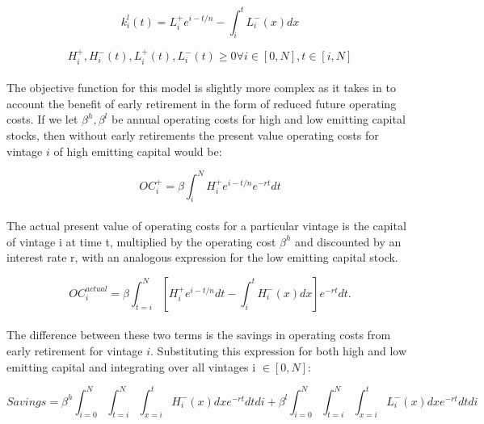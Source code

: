 \documentclass{article}
\begin{document}
\begin{equation}
k_i^l(t) = L_i^+ e^{i-t/n} - \int_i^t L^-_i(x)dx
\end{equation}

\begin{equation}
H^+_i, H^-_i(t), L^+_i(t), L^-_i(t) \geq 0 \forall i \in [0,N], t \in [i,N]
\end{equation}


\paragraph{} The objective function for this model is slightly more complex as it takes in to account the benefit of early retirement in the form of reduced future operating costs. If we let $\beta^h, \beta^l$ be annual operating costs for high and low emitting capital stocks, then without early retirements the present value operating costs for vintage $i$ of high emitting capital would be:

\begin{equation}
OC^+_i=\beta \int_i^N H_i^+e^{i-t/n}e^{-rt}dt
\end{equation}

\paragraph{} The actual present value of operating costs for a particular vintage is the capital of vintage i at time t, multiplied by the operating cost $\beta^h$ and discounted by an interest rate r, with an analogous expression for the low emitting capital stock. 

\begin{equation}
OC^{actual}_i=\beta \int_{t=i}^N \left[H_i^+e^{i-t/n}dt -\int_i^tH_i^-(x)dx\right] e^{-rt}dt.
\end{equation}

\paragraph{} The difference between these two terms is the savings in operating costs from early retirement for vintage $i$. Substituting this expression for both high and low emitting capital and integrating over all vintages  i $\in [0,N]$:

\begin{equation}
Savings = \beta^h \int_{i=0}^N \int_{t=i}^N \int_{x=i}^t H^-_i(x) dx e^{-rt} dt di + \beta^l \int_{i=0}^N \int_{t=i}^N\int_{x=i}^t L_i^-(x) dx e^{-rt} dt di
\end{equation}
\end{document}
